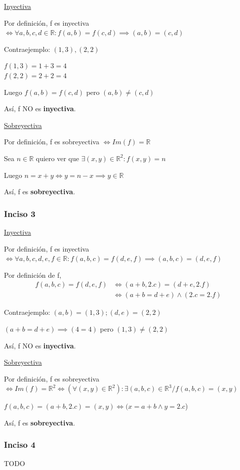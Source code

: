 \underline{Inyectiva}

Por definición, f es inyectiva $\iff \forall a,b,c,d \in \mathbb{R}: f(a,b) = f(c,d) \implies (a,b) = (c,d)$

Contraejemplo: $(1,3), (2,2)$

$f(1,3) = 1+3 = 4$ \\
$f(2,2) = 2+2 = 4$

Luego $f(a,b) = f(c,d)$ pero $(a,b) \neq (c,d)$

Así, f NO es \textbf{inyectiva}.

\underline{Sobreyectiva}

Por definición, f es sobreyectiva $\iff Im(f) = \mathbb{R}$

Sea $n \in \mathbb{R}$ quiero ver que $\exists (x,y) \in \mathbb{R}^2: f(x,y) = n$

Luego $n = x+y \iff y = n-x \implies y \in \mathbb{R}$

Así, f es \textbf{sobreyectiva}.

\subsubsection{Inciso 3}

\underline{Inyectiva}

Por definición, f es inyectiva $\iff \forall a,b,c,d,e,f \in \mathbb{R}: f(a,b,c) = f(d,e,f) \implies (a,b,c) = (d,e,f)$

Por definición de f,
\begin{align*}
    f(a,b,c) = f(d,e,f) &\iff (a+b, 2.c) = (d+e, 2.f)\\
    &\iff (a+b = d+e) \wedge (2.c = 2.f)
\end{align*}

Contraejemplo: $(a,b) = (1,3); (d,e) = (2,2)$

$(a+b = d+e) \implies (4=4)$ pero $(1,3) \neq (2,2)$

Así, f NO es \textbf{inyectiva}.

\underline{Sobreyectiva}

Por definición, f es sobreyectiva $\iff Im(f) = \mathbb{R}^2 \iff (\forall (x,y) \in \mathbb{R}^2): \exists (a,b,c) \in \mathbb{R}^3 / f(a,b,c) = (x,y)$

$f(a,b,c) = (a+b, 2.c) = (x,y) \iff (x = a+b \wedge y = 2.c$)

Así, f es \textbf{sobreyectiva}.

\subsubsection{Inciso 4}
TODO

